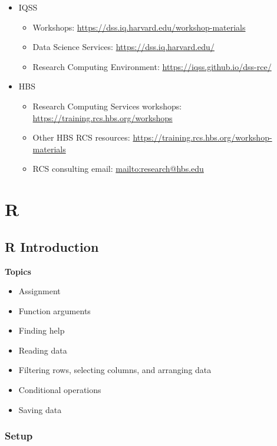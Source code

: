 \documentclass[]{book}
\providecommand{\tightlist}{%
  \setlength{\itemsep}{0pt}\setlength{\parskip}{0pt}}
\begin{document}
\begin{itemize}
\tightlist
\item
  IQSS

  \begin{itemize}
  \tightlist
  \item
    Workshops: \url{https://dss.iq.harvard.edu/workshop-materials}
  \item
    Data Science Services: \url{https://dss.iq.harvard.edu/}
  \item
    Research Computing Environment:
    \url{https://iqss.github.io/dss-rce/}
  \end{itemize}
\item
  HBS

  \begin{itemize}
  \tightlist
  \item
    Research Computing Services workshops:
    \url{https://training.rcs.hbs.org/workshops}
  \item
    Other HBS RCS resources:
    \url{https://training.rcs.hbs.org/workshop-materials}
  \item
    RCS consulting email: \url{mailto:research@hbs.edu}
  \end{itemize}
\end{itemize}

\part{R}\label{part-r}

\chapter{R Introduction}\label{r-introduction}

\textbf{Topics}

\begin{itemize}
\tightlist
\item
  Assignment
\item
  Function arguments
\item
  Finding help
\item
  Reading data
\item
  Filtering rows, selecting columns, and arranging data
\item
  Conditional operations
\item
  Saving data
\end{itemize}

\section{Setup}\label{setup}
\end{document}
